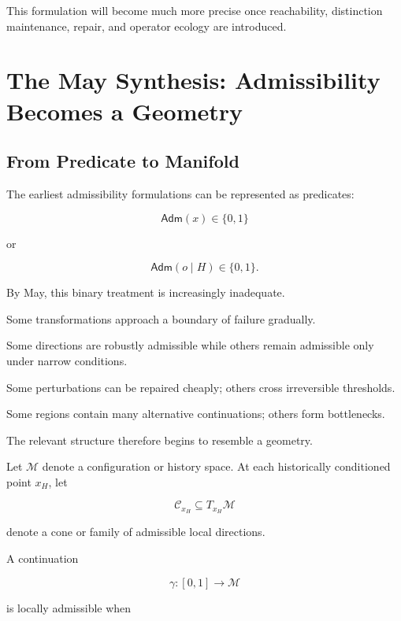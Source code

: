 \documentclass[11pt]{article}
\theoremstyle{remark}
\begin{document}
This formulation will become much more precise once reachability, distinction maintenance, repair, and operator ecology are introduced.

\section{The May Synthesis: Admissibility Becomes a Geometry}

\subsection{From Predicate to Manifold}

The earliest admissibility formulations can be represented as predicates:

\begin{equation}
\mathsf{Adm}(x)\in\{0,1\}
\end{equation}

or

\begin{equation}
\mathsf{Adm}(o\mid H)\in\{0,1\}.
\end{equation}

By May, this binary treatment is increasingly inadequate.

Some transformations approach a boundary of failure gradually.

Some directions are robustly admissible while others remain admissible only under narrow conditions.

Some perturbations can be repaired cheaply; others cross irreversible thresholds.

Some regions contain many alternative continuations; others form bottlenecks.

The relevant structure therefore begins to resemble a geometry.

Let $\mathcal{M}$ denote a configuration or history space. At each historically conditioned point $x_H$, let

\begin{equation}
\mathcal{C}_{x_H}
\subseteq
T_{x_H}\mathcal{M}
\end{equation}

denote a cone or family of admissible local directions.

A continuation

\begin{equation}
\gamma:[0,1]\rightarrow\mathcal{M}
\end{equation}

is locally admissible when
\end{document}
